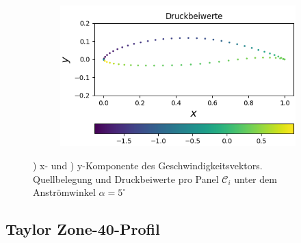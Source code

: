\begin{figure}[!ht]
\begin{subfigure}[b]{0.475\linewidth}
    \caption{\label{fig:nlfq}}
  \end{subfigure}
  \hfill
  \begin{subfigure}[b]{0.475\linewidth}
    \centering\includegraphics[scale=0.5]{figures/nlfcp.png} 
    \caption{\label{fig:nlfcp}}
  \end{subfigure}
  
  \caption{) x- und ) y-Komponente des Geschwindigkeitsvektors.  Quellbelegung und  Druckbeiwerte pro Panel $\mathcal{C}_{i}$ unter dem Anströmwinkel $\alpha =5^{\circ}$}
\end{figure}
\newpage
\subsection{Taylor Zone-40-Profil}

